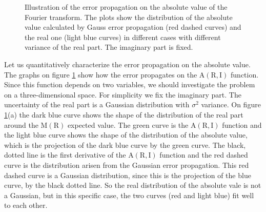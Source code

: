 \documentclass[a4paper,12pt,oneside]{article}
\newcommand{\Abs}{\mathrm{A}}
\newcommand{\R}{\mathrm{R}}
\newcommand{\I}{\mathrm{I}}
\begin{document}
\begin{figure}[htb!]
  \centerline{}
  \caption{\label{fig:abs_illustration}Illustration of the error propagation on the absolute value of the Fourier transform. The plots show the distribution of the absolute value calculated by Gauss error propagation (red dashed curves) and the real one (light blue curves) in different cases with different variance of the real part. The imaginary part is fixed.}
\end{figure}
Let us quantitatively characterize the error propagation on the absolute value. The graphs on figure \ref{fig:abs_illustration} show how the error propagates on the $\Abs(\R, \I)$ function. Since this function depends on two variables, we should investigate the problem on a three-dimensional space. For simplicity we fix the imaginary part. The uncertainty of the real part is a Gaussian distribution with $\sigma^2$ variance. On figure \ref{fig:abs_illustration}(a) the dark blue curve shows the shape of the distribution of the real part around the M$(\R)$ expected value. The green curve is the $\Abs(\R,\I)$ function and the light blue curve shows the shape of the distribution of the absolute value, which is the projection of the dark blue curve by the green curve. The black, dotted line is the first derivative of the $\Abs(\R, \I)$ function and the red dashed curve is the distribution arisen from the Gaussian error propagation. This red dashed curve is a Gaussian distribution, since this is the projection of the blue curve, by the black dotted line. So the real distribution of the absolute vale is not a Gaussian, but in this specific case, the two curves (red and light blue) fit well to each other.
\end{document}
